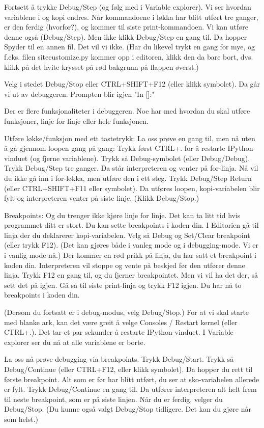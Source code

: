 \documentclass[a4paper,11pt,utf8]{book}
\begin{document}
Fortsett å trykke Debug/Step (og følg med i Variable explorer).
Vi ser hvordan variablene i og kopi endres.
Når kommandoene i løkka har blitt utført tre ganger, er den ferdig (hvorfor?),
og kommer til siste print-kommandoen.
Vi kan utføre denne også (Debug/Step).
Men ikke klikk Debug/Step en gang til. Da hopper Spyder til en annen fil.
Det vil vi ikke.
(Har du likevel trykt en gang for mye, og f.eks. filen sitecustomize.py
kommer opp i editoren, klikk den da bare bort, dvs. klikk på det hvite
krysset på rød bakgrunn på flappen øverst.)

Velg i stedet Debug/Stop eller CTRL+SHIFT+F12 (eller klikk symbolet).
Da går vi ut av debuggeren.
Prompten blir igjen "In []:"


Der er flere funksjonaliteter i debuggeren.
Noe har med hvordan du skal utføre funksjoner, linje for linje eller hele funksjonen.


Utføre løkke/funksjon med ett tastetrykk: 
La oss prøve en gang til, men nå uten å gå gjennom loopen gang på gang:
Trykk først CTRL+. for å restarte IPython-vinduet (og fjerne variablene).
Trykk så Debug-symbolet (eller Debug/Debug).
Trykk Debug/Step tre ganger.
Da står interpreteren og venter på for-linja. 
Nå vil du ikke gå inn i for-løkka, men utføre den i ett steg.
Trykk Debug/Step Return (eller CTRL+SHIFT+F11 eller symbolet).
Da utføres loopen, kopi-variabelen blir fylt og interpreteren venter på siste linje.
(Klikk Debug/Stop.)


Breakpoints: 
Og du trenger ikke kjøre linje for linje.
Det kan ta litt tid hvis programmet ditt er stort. 
Du kan sette breakpoints i koden din.
I Editorien gå til linja der du deklarerer kopi-variabelen.
Velg så Debug og Set/Clear breakpoint (eller trykk F12).
(Det kan gjøres både i vanleg mode og i debugging-mode. Vi er i vanlig mode nå.) 
Der kommer en rød prikk på linja, du har satt et breakpoint i koden din.
Interpreteren vil stoppe og vente på beskjed før den utfører denne linja. 
Trykk F12 en gang til, og du fjerner breakpointet.
Men vi vil ha det der, så sett det på igjen.
Gå så til siste print-linja og trykk F12 igjen.
Du har nå to breakpoints i koden din.

(Dersom du fortsatt er i debug-modus, velg Debug/Stop.)
For at vi skal starte med blanke ark, kan det være greit å velge
Consoles / Restart kernel (eller CTRL+.).
Det tar et par sekunder å restarte IPython-vinduet.
I Variable explorer ser du nå at alle variablene er borte.

La oss nå prøve debugging via breakpoints.
Trykk Debug/Start.
Trykk så Debug/Continue (eller CTRL+F12, eller klikk symbolet). 
Da hopper du rett til første breakpoint. 
Alt som er før har blitt utført, du ser at sko-variabelen allerede er fylt.
Trykk Debug/Continue en gang til.
Da utfører interpreteren alt helt frem til neste breakpoint, som er på siste linjen.
Når du er ferdig, velger du Debug/Stop.
(Du kunne også valgt Debug/Stop tidligere. Det kan du gjøre når som helst.) 
\end{document}
